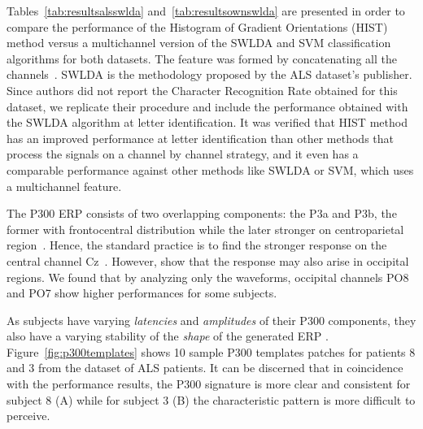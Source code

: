 \documentclass[utf8]{frontiersSCNS} %
\begin{document}

Tables~\ref{tab:resultsalsswlda} and~\ref{tab:resultsownswlda} are presented in order to compare the performance of the Histogram of Gradient Orientations (HIST) method versus a multichannel version of the SWLDA and SVM classification algorithms for both datasets.  The feature was formed by concatenating all the channels~\citep{Krusienski2006}.  SWLDA is the methodology proposed by the ALS dataset's publisher. Since authors \cite{Riccio2013} did not report the Character Recognition Rate obtained for this dataset, we replicate their procedure and include the performance obtained with the SWLDA algorithm at letter identification.  It was verified that HIST method has an improved performance at letter identification than other methods that process the signals on a channel by channel strategy, and it even has a comparable performance against other methods like SWLDA or SVM, which uses a multichannel feature.


The P300 ERP  consists of two overlapping components: the P3a and P3b, the former with frontocentral distribution while the later stronger on centroparietal region~\citep{Polich2007}. Hence, the standard practice is to find the stronger response on the central channel Cz~\citep{Riccio2013}. However, \cite{Krusienski2006} show that the response may also arise in occipital regions.  We found that by analyzing only the waveforms, occipital channels PO8 and PO7 show higher performances for some subjects. 


As subjects have varying \textit{latencies} and \textit{amplitudes} of their P300 components, they also have a varying stability of the \textit{shape} of the generated ERP \citep{Nam2010}.  Figure~\ref{fig:p300templates} shows 10 sample P300 templates patches for patients 8 and 3 from the dataset of ALS patients. It can be discerned that in coincidence with the performance results, the P300 signature is more clear and consistent for subject 8 (A) while for subject 3 (B) the characteristic pattern is more difficult to perceive.
\end{document}
